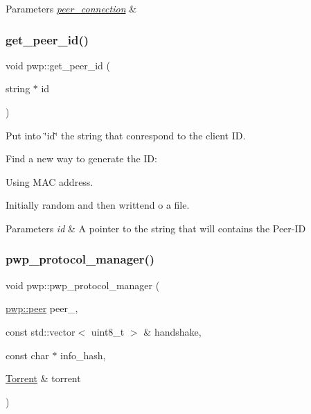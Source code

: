 \begin{DoxyParams}{Parameters}
{\em \hyperlink{structpwp_1_1peer__connection}{peer\+\_\+connection}} & \\
\hline
\end{DoxyParams}
\mbox{\label{namespacepwp_ada6a8613896dbbfd6fba63b17d51684c}} 
\subsubsection{\texorpdfstring{get\+\_\+peer\+\_\+id()}{get\_peer\_id()}}
{\footnotesize\ttfamily void pwp\+::get\+\_\+peer\+\_\+id (\begin{DoxyParamCaption}\item[{string $\ast$}]{id }\end{DoxyParamCaption})}



Put into \char`\"{}id\char`\"{} the string that conrespond to the client ID. 

Find a new way to generate the ID\+:
\begin{DoxyEnumerate}
\item Using M\+AC address.
\item Initially random and then writtend o a file.
\end{DoxyEnumerate}


\begin{DoxyParams}{Parameters}
{\em id} & A pointer to the string that will contains the Peer-\/\+ID \\
\hline
\end{DoxyParams}
\mbox{\label{namespacepwp_a62060bdcdc80541b0892e26fbeab1e91}} 
\subsubsection{\texorpdfstring{pwp\+\_\+protocol\+\_\+manager()}{pwp\_protocol\_manager()}}
{\footnotesize\ttfamily void pwp\+::pwp\+\_\+protocol\+\_\+manager (\begin{DoxyParamCaption}\item[{\hyperlink{structpwp_1_1peer}{pwp\+::peer}}]{peer\+\_\+,  }\item[{const std\+::vector$<$ uint8\+\_\+t $>$ \&}]{handshake,  }\item[{const char $\ast$}]{info\+\_\+hash,  }\item[{\hyperlink{structtorr_1_1Torrent}{Torrent} \&}]{torrent }\end{DoxyParamCaption})}




